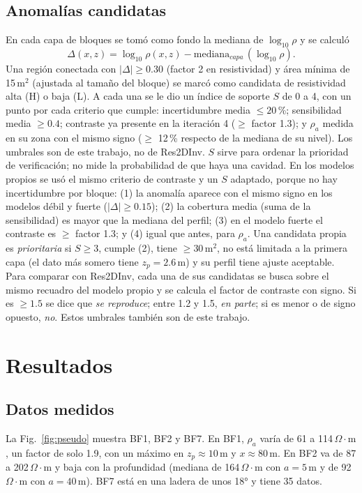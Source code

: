 \documentclass[conference]{IEEEtran}
\newcommand{\ohmm}{\ensuremath{\Omega\!\cdot\!\mathrm{m}}}
\begin{document}
\subsection{Anomal\'ias candidatas}
En cada capa de bloques se tom\'o como fondo la mediana de $\log_{10}\rho$ y se calcul\'o
\begin{equation}
\Delta(x,z)=\log_{10}\rho(x,z)-\mathrm{mediana}_{capa}\,(\log_{10}\rho). \label{eq:delta}
\end{equation}
Una regi\'on conectada con $|\Delta|\ge 0.30$ (factor 2 en resistividad) y \'area m\'inima de 15\,m$^2$ (ajustada al tama\~no del bloque) se marc\'o como candidata de resistividad alta (H) o baja (L). A cada una se le dio un \'indice de soporte $S$ de 0 a 4, con un punto por cada criterio que cumple: incertidumbre media $\le 20$\,\%; sensibilidad media $\ge 0.4$; contraste ya presente en la iteraci\'on 4 ($\ge$ factor 1.3); y $\rho_a$ medida en su zona con el mismo signo ($\ge$ 12\,\% respecto de la mediana de su nivel). Los umbrales son de este trabajo, no de Res2DInv. $S$ sirve para ordenar la prioridad de verificaci\'on; no mide la probabilidad de que haya una cavidad. En los modelos propios se us\'o el mismo criterio de contraste y un $S$ adaptado, porque no hay incertidumbre por bloque: (1) la anomal\'ia aparece con el mismo signo en los modelos d\'ebil y fuerte ($|\Delta|\ge 0.15$); (2) la cobertura media (suma de la sensibilidad) es mayor que la mediana del perfil; (3) en el modelo fuerte el contraste es $\ge$ factor 1.3; y (4) igual que antes, para $\rho_a$. Una candidata propia es \emph{prioritaria} si $S\ge 3$, cumple (2), tiene $\ge 30$\,m$^2$, no est\'a limitada a la primera capa (el dato m\'as somero tiene $z_p=2.6$\,m) y su perfil tiene ajuste aceptable. Para comparar con Res2DInv, cada una de sus candidatas se busca sobre el mismo recuadro del modelo propio y se calcula el factor de contraste con signo. Si es $\ge 1.5$ se dice que \emph{se reproduce}; entre 1.2 y 1.5, \emph{en parte}; si es menor o de signo opuesto, \emph{no}. Estos umbrales tambi\'en son de este trabajo.

\section{Resultados}
\subsection{Datos medidos}
La Fig.~\ref{fig:pseudo} muestra BF1, BF2 y BF7. En BF1, $\rho_a$ var\'ia de 61 a 114\,\ohmm, un factor de solo 1.9, con un m\'aximo en $z_p\approx 10$\,m y $x\approx 80$\,m. En BF2 va de 87 a 202\,\ohmm{} y baja con la profundidad (mediana de 164\,\ohmm{} con $a=5$\,m y de 92\,\ohmm{} con $a=40$\,m). BF7 est\'a en una ladera de unos 18° y tiene 35 datos.
\end{document}
